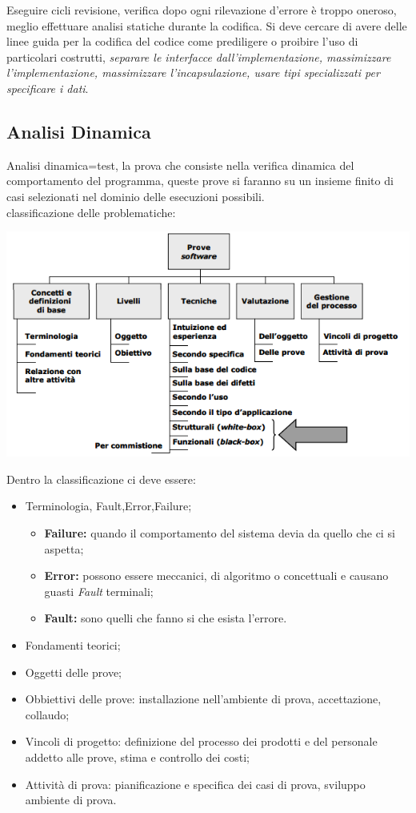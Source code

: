 Eseguire cicli revisione, verifica dopo ogni rilevazione d'errore è troppo oneroso, meglio effettuare analisi statiche durante la codifica. Si deve cercare di avere delle linee guida per la codifica del codice come prediligere o proibire l'uso di particolari costrutti, \textit{separare le interfacce dall'implementazione, massimizzare l'implementazione, massimizzare l'incapsulazione, usare tipi specializzati per specificare i dati}.

\subsection{Analisi Dinamica}

Analisi dinamica=test, la prova che consiste nella verifica dinamica del comportamento del programma, queste prove si faranno su un insieme finito di casi selezionati nel dominio delle esecuzioni possibili.\\

classificazione delle problematiche:

\includegraphics[width=0.5\columnwidth]{img6} %

Dentro la classificazione ci deve essere:

\begin{itemize}
	\item Terminologia, Fault,Error,Failure;
	\begin{itemize}
		\item \textbf{Failure:} quando il comportamento del sistema devia da quello che ci si aspetta;
		\item \textbf{Error:} possono essere meccanici, di algoritmo o concettuali e causano guasti \textit{Fault} terminali;
		\item \textbf{Fault:} sono quelli che fanno si che esista l'errore.
	\end{itemize}
	\item Fondamenti teorici;
	\item Oggetti delle prove;
	\item Obbiettivi delle prove: installazione nell'ambiente di prova, accettazione, collaudo;
	\item Vincoli di progetto: definizione del processo dei prodotti e del personale addetto alle prove, stima e controllo dei costi;
	\item Attività di prova: pianificazione e specifica dei casi di prova, sviluppo ambiente di prova.
\end{itemize}

